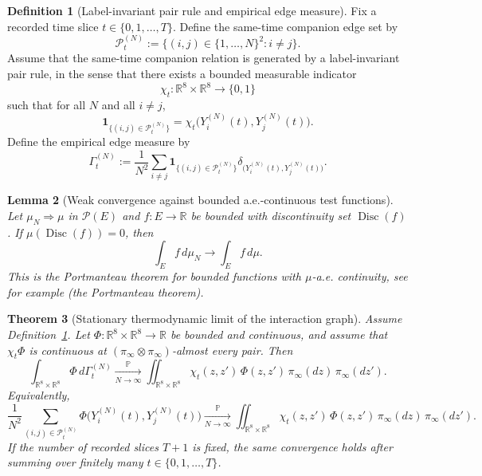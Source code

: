 \documentclass[11pt]{article}
\newtheorem{theorem}{Theorem}[section]
\newtheorem{lemma}[theorem]{Lemma}
\theoremstyle{definition}
\newtheorem{definition}[theorem]{Definition}
\theoremstyle{remark}
\newcommand{\R}{\mathbb R}
\newcommand{\Tset}{\{0,1,\dots,T\}}
\newcommand{\mcP}{\mathcal P}
\newcommand{\one}{\mathbf 1}
\begin{document}
\begin{definition}[Label-invariant pair rule and empirical edge measure]
\label{def:edge-measure}
Fix a recorded time slice \(t\in\Tset\).
Define the same-time companion edge set by
\[
\mcP_t^{(N)}
:=
\{(i,j)\in\{1,\dots,N\}^2:i\neq j\}.
\]
Assume that the same-time companion relation is generated by a label-invariant
pair rule, in the sense that there exists a bounded measurable indicator
\[
\chi_t:\R^8\times\R^8\to\{0,1\}
\]
such that for all \(N\) and all \(i\neq j\),
\[
\one_{\{(i,j)\in\mcP_t^{(N)}\}}
=
\chi_t\!\bigl(Y_i^{(N)}(t),Y_j^{(N)}(t)\bigr).
\]
Define the empirical edge measure by
\[
\Gamma_t^{(N)}
:=
\frac1{N^2}\sum_{i\neq j}
\one_{\{(i,j)\in\mcP_t^{(N)}\}}
\delta_{\bigl(Y_i^{(N)}(t),Y_j^{(N)}(t)\bigr)}.
\]
\end{definition}

\begin{lemma}[Weak convergence against bounded a.e.-continuous test functions]
\label{lem:weak-ae-continuous}
Let \(\mu_N\Rightarrow\mu\) in \(\mcP(E)\) and \(f:E\to\R\) be bounded with
discontinuity set \(\operatorname{Disc}(f)\). If
\(\mu(\operatorname{Disc}(f))=0\), then
\[
\int_E f\,d\mu_N\to \int_E f\,d\mu.
\]
This is the Portmanteau theorem for bounded functions with \(\mu\)-a.e.
continuity, see for example
\cite[Theorem 2.1]{billingsley1999convergence}
(the Portmanteau theorem).
\end{lemma}

\begin{theorem}[Stationary thermodynamic limit of the interaction graph]
\label{thm:edge-measure-limit}
Assume Definition~\ref{def:edge-measure}.
Let \(\Phi:\R^8\times\R^8\to\R\) be bounded and continuous, and assume that
\(\chi_t\Phi\) is continuous at \((\pi_\infty\otimes\pi_\infty)\)-almost every
pair.
Then
\[
\int_{\R^8\times\R^8}\Phi\,d\Gamma_t^{(N)}
\xrightarrow[N\to\infty]{\mathbb P}
\iint_{\R^8\times\R^8}
\chi_t(z,z')\,\Phi(z,z')\,\pi_\infty(dz)\,\pi_\infty(dz').
\]
Equivalently,
\[
\frac1{N^2}\sum_{(i,j)\in\mcP_t^{(N)}}
\Phi\!\bigl(Y_i^{(N)}(t),Y_j^{(N)}(t)\bigr)
\xrightarrow[N\to\infty]{\mathbb P}
\iint_{\R^8\times\R^8}
\chi_t(z,z')\,\Phi(z,z')\,\pi_\infty(dz)\,\pi_\infty(dz').
\]
If the number of recorded slices \(T+1\) is fixed, the same convergence holds
after summing over finitely many \(t\in\Tset\).
\end{theorem}
\end{document}
